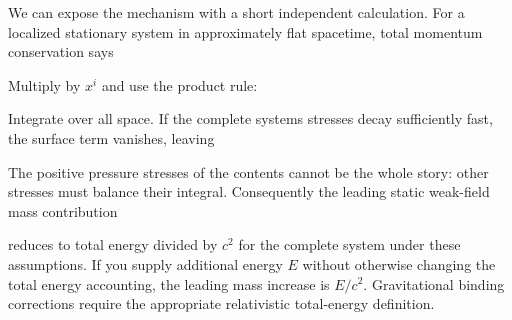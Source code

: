 \documentclass[
  11pt,
  letterpaper,
  oneside,
  openany]{scrbook}
\begin{document}
We can expose the mechanism with a short independent calculation. For a
localized stationary system in approximately flat spacetime, total
momentum conservation says

\begin{center}
\begingroup
{}
\ifdim\wd\grmathbox>\linewidth
\resizebox{\linewidth}{!}{\usebox{\grmathbox}}
\else\usebox{\grmathbox}\fi
\endgroup
\end{center}

Multiply by \(x^i\) and use the product rule:

\begin{center}
\begingroup
{}
\ifdim\wd\grmathbox>\linewidth
\resizebox{\linewidth}{!}{\usebox{\grmathbox}}
\else\usebox{\grmathbox}\fi
\endgroup
\end{center}

Integrate over all space. If the complete system\textquotesingle s
stresses decay sufficiently fast, the surface term vanishes, leaving

\begin{center}
\begingroup
{}
\ifdim\wd\grmathbox>\linewidth
\resizebox{\linewidth}{!}{\usebox{\grmathbox}}
\else\usebox{\grmathbox}\fi
\endgroup
\end{center}

The positive pressure stresses of the contents cannot be the whole
story: other stresses must balance their integral. Consequently the
leading static weak-field mass contribution

\begin{center}
\begingroup
{}
\ifdim\wd\grmathbox>\linewidth
\resizebox{\linewidth}{!}{\usebox{\grmathbox}}
\else\usebox{\grmathbox}\fi
\endgroup
\end{center}

reduces to total energy divided by \(c^2\) for the complete system under
these assumptions. If you supply additional energy \(E\) without
otherwise changing the total energy accounting, the leading mass
increase is \(E/c^2\). Gravitational binding corrections require the
appropriate relativistic total-energy definition.
\end{document}
